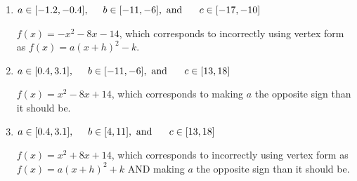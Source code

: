 \documentclass{extbook}[14pt]
\begin{document}
\begin{enumerate}
{\begin{enumerate}[label=\Alph*.]
* $f(x)=-x^{2} +8 x -18$, which is the correct option.
\item \( a \in [-1.2, -0.4], \hspace*{5mm} b \in [-11, -6], \text{ and } \hspace*{5mm} c \in [-17, -10] \)

$f(x)=-x^{2} -8 x -14$, which corresponds to incorrectly using vertex form as $f(x) = a(x+h)^2 - k$.
\item \( a \in [0.4, 3.1], \hspace*{5mm} b \in [-11, -6], \text{ and } \hspace*{5mm} c \in [13, 18] \)

$f(x)=x^{2} -8 x + 14$, which corresponds to making $a$ the opposite sign than it should be.
\item \( a \in [0.4, 3.1], \hspace*{5mm} b \in [4, 11], \text{ and } \hspace*{5mm} c \in [13, 18] \)

$f(x)=x^{2} +8 x + 14$, which corresponds to incorrectly using vertex form as $f(x) = a(x+h)^2+k$ AND making $a$ the opposite sign than it should be.
\end{enumerate}

}
\end{enumerate}
\end{document}
